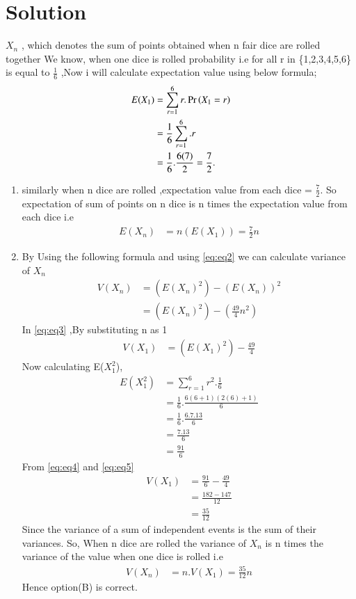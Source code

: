 \documentclass[journal,12pt,twocolumn]{IEEEtran}
\begin{document}
\section{Solution}
$X_{n}$ , which denotes the sum of points obtained when n fair dice are rolled together
We know, when one dice is rolled probability i.e  for all r in \{1,2,3,4,5,6\} is equal to  $\frac{1}{6}$ ,Now i will calculate expectation value
using below formula;
\begin{align}
 E( X_{1})&=  \sum_{r=1}^6 r.\Pr\left(X_{1}=r\right)
 \label{eq:eq1}
\\
&=\frac{1}{6}\sum_{r=1}^6 .r
\\
&=\frac{1}{6}.\frac{6(7)}{2} =\frac{7}{2}.
\end{align}
\begin{enumerate}
\item similarly when n dice are rolled ,expectation value from each dice 
= $\frac{7}{2} $. 
So expectation of sum of points on n dice is n times the expectation value from each dice i.e
\begin{align}
    E(X_{n})& = n(E(X_{1})) =\frac{7}{2} n 
\label{eq:eq2}
\end{align}
\item By Using the following formula and using \eqref{eq:eq2}  we can calculate variance of  $X_{n}$ 
    \begin{align}
    V(X_{n})&=(E(X_{n})^{2}) - (E(X_{n}))^{2}
    \\
    &=(E(X_{n})^{2}) - (\frac{49}{4}n^{2})
    \label{eq:eq3}
    \end{align}
    In \eqref{eq:eq3} ,By substituting n as 1 
    \begin{align}
        V(X_{1})&=(E(X_{1})^{2}) - \frac{49}{4}
        \label{eq:eq4}
    \end{align}
    Now calculating E($X_{1}^{2}$),
    \begin{align}
      E(X_{1}^{2})&=\sum_{r=1}^6r^{2}.\frac{1}{6}
      \\
      &=\frac{1}{6}.\frac{6(6+1)(2(6)+1)}{6}
      \\
      &=\frac{1}{6}.\frac{6.7.13}{6}
      \\
      &=\frac{7.13}{6}
      \\
      &=\frac{91}{6}
      \label{eq:eq5}
    \end{align}
    From \eqref{eq:eq4} and \eqref{eq:eq5}
    \begin{align}
        V(X_{1})&=\frac{91}{6} -\frac{49}{4}
        \\
        &=\frac{182-147}{12}
        \\
        &=\frac{35}{12}
        \label{eq:eq6}
    \end{align}
    Since the variance of a sum of independent events is the sum of their variances. So, When n dice are rolled the variance of $X_{n}$ is n times the variance of the value when one dice is rolled i.e
    \begin{align}
        V(X_{n})&=n.V(X_{1}) = \frac{35}{12}n
    \end{align}
    Hence option(B) is correct.
\end{enumerate}
\end{document}
